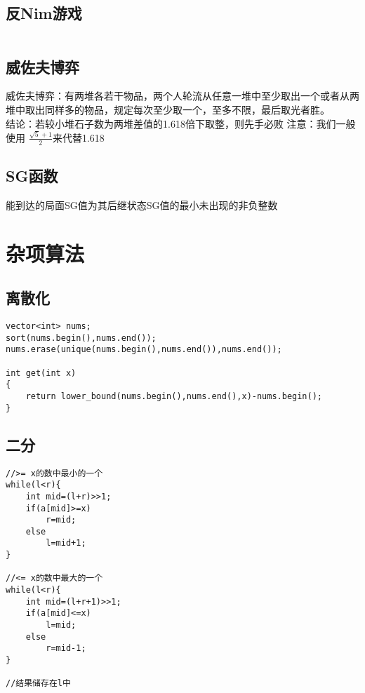 \documentclass[twocolumn,a4]{article}
\begin{document}
\subsection{反Nim游戏}
\begin{lstlisting}

\end{lstlisting}

\subsection{威佐夫博弈}
威佐夫博弈：有两堆各若干物品，两个人轮流从任意一堆中至少取出一个或者从两堆中取出同样多的物品，规定每次至少取一个，至多不限，最后取光者胜。\\
结论：若较小堆石子数为两堆差值的1.618倍下取整，则先手必败
注意：我们一般使用 $\frac{\sqrt{5}+1}{2}$来代替1.618

\subsection{SG函数}
能到达的局面SG值为其后继状态SG值的最小未出现的非负整数

\section{杂项算法}

\subsection{离散化}
\begin{lstlisting}
vector<int> nums;
sort(nums.begin(),nums.end());
nums.erase(unique(nums.begin(),nums.end()),nums.end());

int get(int x)
{
    return lower_bound(nums.begin(),nums.end(),x)-nums.begin();
}
\end{lstlisting}
\subsection{二分}
\begin{lstlisting}
//>= x的数中最小的一个
while(l<r){
    int mid=(l+r)>>1;
    if(a[mid]>=x)
        r=mid;
    else
        l=mid+1;
}

//<= x的数中最大的一个
while(l<r){
    int mid=(l+r+1)>>1;
    if(a[mid]<=x)
        l=mid;
    else
        r=mid-1;
}

//结果储存在l中
\end{lstlisting}
\end{document}
